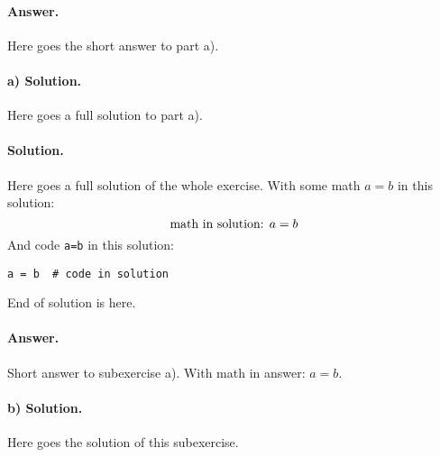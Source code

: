 \documentclass[
oneside,                 
final,                   
10pt]{article}
\begin{document}
                             


\paragraph{Answer.}
Here goes the short answer to part a).

\paragraph{a) Solution.}
Here goes a full solution to part a).

                             


\paragraph{Solution.}
Here goes a full solution of the whole exercise.
With some math $a=b$ in this solution:
\[ \hbox{math in solution: } a = b \]
And code \texttt{a=b} in this solution:


\begin{Verbatim}[numbers=none,fontsize=\fontsize{9pt}{9pt},baselinestretch=0.95,xleftmargin=2mm]
a = b  # code in solution

\end{Verbatim}

End of solution is here.

\paragraph{Answer.}
Short answer to subexercise a).
With math in answer: $a=b$.

\paragraph{b) Solution.}
Here goes the solution of this subexercise.

                             
\end{document}
